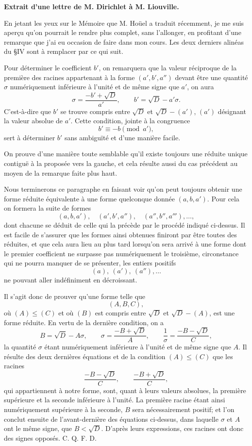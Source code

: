 \documentclass[11pt]{article}
\begin{document}
\begin{center}
\textbf{Extrait d'une lettre de M. Dirichlet à M. Liouville.}
\end{center}

En jetant les yeux sur le Mémoire que M. Hoüel a traduit récemment, je me suis aperçu qu'on pourrait le rendre plus complet, sans l'allonger, en profitant d'une remarque que j'ai eu occasion de faire dans mon cours. Les deux derniers alinéas du \S IV sont à remplacer par ce qui suit.

Pour déterminer le coefficient $b'$, on remarquera que la valeur réciproque de la première des racines appartenant à la forme $(a',b',a'')$ devant être une quantité $\sigma$ numériquement inférieure à l'unité et de même signe que $a'$, on aura
\[
  \sigma=\frac{-b'+\sqrt D}{a'},\qquad
  b'=\sqrt D-a'\sigma.
\]
C'est-à-dire que $b'$ se trouve compris entre $\sqrt D$ et $\sqrt D-(a')$, $(a')$ désignant la valeur absolue de $a'$. Cette condition, jointe à la congruence
\[
  b'\equiv-b\pmod {a'},
\]
sert à déterminer $b'$ sans ambiguïté et d'une manière facile.

On prouve d'une manière toute semblable qu'il existe toujours une réduite unique contiguë à la proposée vers la gauche, et cela résulte aussi du cas précédent au moyen de la remarque faite plus haut.

Nous terminerons ce paragraphe en faisant voir qu'on peut toujours obtenir une forme réduite équivalente à une forme quelconque donnée $(a,b,a')$. Pour cela on formera la suite de formes
\[
 (a,b,a'),\quad (a',b',a''),\quad (a'',b'',a'''),\ldots,
\]
dont chacune se déduit de celle qui la précède par le procédé indiqué ci-dessus. Il est facile de s'assurer que les formes ainsi obtenues finiront par être toutes des réduites, et que cela aura lieu au plus tard lorsqu'on sera arrivé à une forme dont le premier coefficient ne surpasse pas numériquement le troisième, circonstance qui ne pourra manquer de se présenter, les entiers positifs
\[
  (a),\ (a'),\ (a''),\ldots
\]
ne pouvant aller indéfiniment en décroissant.

Il s'agit donc de prouver qu'une forme telle que
\[
  (A,B,C),
\]
où $(A)\leq(C)$ et où $(B)$ est compris entre $\sqrt D$ et $\sqrt D-(A)$, est une forme réduite. En vertu de la dernière condition, on a
\[
  B=\sqrt D-A\sigma,
  \qquad
  \sigma=\frac{-B+\sqrt D}{A},
  \qquad
  \frac1\sigma=\frac{-B-\sqrt D}{C},
\]
la quantité $\sigma$ étant numériquement inférieure à l'unité et de même signe que $A$. Il résulte des deux dernières équations et de la condition $(A)\leq(C)$ que les racines
\[
  \frac{-B-\sqrt D}{C},\qquad
  \frac{-B+\sqrt D}{C},
\]
qui appartiennent à notre forme, sont, quant à leurs valeurs absolues, la première supérieure et la seconde inférieure à l'unité. La première racine étant ainsi numériquement supérieure à la seconde, $B$ sera nécessairement positif; et l'on conclut ensuite de l'avant-dernière des équations ci-dessus, dans laquelle $\sigma$ et $A$ ont le même signe, que $B<\sqrt D$. D'après leurs expressions, ces racines ont donc des signes opposés. C. Q. F. D.
\end{document}
